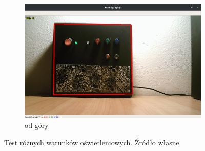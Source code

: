 \documentclass[12pt,twoside,polish]{article}
\begin{document}
\begin{figure}[htb!]
\begin{subfigure}{0.46\textwidth}
		\includegraphics[width=\textwidth]{test_light3}
		\caption{od góry}
		\label{test_light3}
	\end{subfigure}
	\caption{Test różnych warunków oświetleniowych. Źródło własne}
\end{figure}
\FloatBarrier
\end{document}
